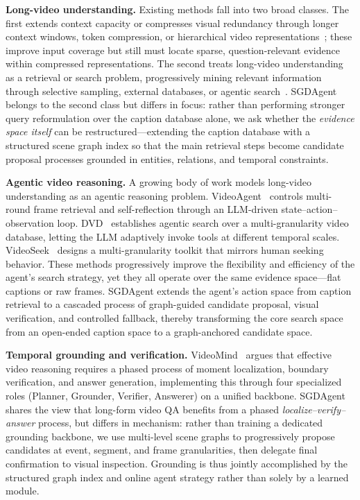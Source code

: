 \documentclass[sigconf, screen, review, anonymous]{acmart}
\begin{document}
\textbf{Long-video understanding.}\quad
Existing methods fall into two broad classes.  The first extends context
capacity or compresses visual redundancy through longer context
windows, token compression, or hierarchical video
representations~\cite{gemini15,qwen,internvl,seed}; these improve input
coverage but still must locate sparse, question-relevant evidence within
compressed representations.  The second treats long-video understanding as
a retrieval or search problem, progressively mining relevant information
through selective sampling, external databases, or agentic
search~\cite{dvd,mrvideo,videoseek}.  SGDAgent belongs to the second
class but differs in focus: rather than performing stronger query
reformulation over the caption database alone, we ask whether the
\emph{evidence space itself} can be restructured---extending the caption
database with a structured scene graph index so that the main retrieval
steps become candidate proposal processes grounded in entities, relations,
and temporal constraints.
 
\textbf{Agentic video reasoning.}\quad
A growing body of work models long-video understanding as an agentic
reasoning problem.  VideoAgent~\cite{videoagent} controls multi-round
frame retrieval and self-reflection through an LLM-driven
state--action--observation loop.  DVD~\cite{dvd} establishes agentic
search over a multi-granularity video database, letting the LLM
adaptively invoke tools at different temporal scales.
VideoSeek~\cite{videoseek} designs a multi-granularity toolkit that
mirrors human seeking behavior.  These methods progressively improve the
flexibility and efficiency of the agent's search strategy, yet they all
operate over the same evidence space---flat captions or raw frames.
SGDAgent extends the agent's action space from caption retrieval to a
cascaded process of graph-guided candidate proposal, visual verification,
and controlled fallback, thereby transforming the core search space from
an open-ended caption space to a graph-anchored candidate space.
 
\textbf{Temporal grounding and verification.}\quad
VideoMind~\cite{videomind} argues that effective video reasoning requires
a phased process of moment localization, boundary verification, and
answer generation, implementing this through four specialized roles
(Planner, Grounder, Verifier, Answerer) on a unified backbone.  SGDAgent
shares the view that long-form video QA benefits from a phased
\emph{localize--verify--answer} process, but differs in mechanism: rather
than training a dedicated grounding backbone, we use multi-level scene
graphs to progressively propose candidates at event, segment, and frame
granularities, then delegate final confirmation to visual inspection.
Grounding is thus jointly accomplished by the structured graph index and
online agent strategy rather than solely by a learned module.
 
\end{document}

